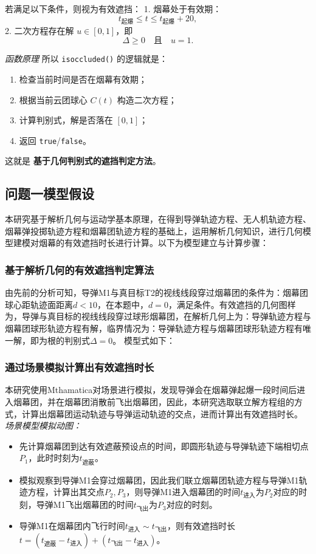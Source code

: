 \documentclass{article}
\begin{document}
若满足以下条件，则视为有效遮挡：
1. 烟幕处于有效期：
\[
t_{\text{起爆}} \leq t \leq t_{\text{起爆}} + 20,
\]
2. 二次方程存在解 $u \in [0,1]$，即
\[
\Delta \geq 0 \quad \text{且} \quad u = 1.
\]

\textit{函数原理}
所以 \texttt{isoccluded()} 的逻辑就是：

\begin{enumerate}[leftmargin=*,label=\arabic*.]
  \item 检查当前时间是否在烟幕有效期；
  \item 根据当前云团球心 \(C(t)\) 构造二次方程；
  \item 计算判别式，解是否落在 \([0,1]\)；
  \item 返回 \texttt{true}/\texttt{false}。
\end{enumerate}

这就是 \textbf{基于几何判别式的遮挡判定方法}。

\subsection{问题一模型假设}

本研究基于解析几何与运动学基本原理，在得到导弹轨迹方程、无人机轨迹方程、烟幕弹投掷轨迹方程和烟幕团轨迹方程的基础上，运用解析几何知识，进行几何模型建模对烟幕的有效遮挡时长进行计算。以下为模型建立与计算步骤：

\subsubsection{基于解析几何的有效遮挡判定算法}

由先前的分析可知，导弹M1与真目标T2的视线线段穿过烟幕团的条件为：烟幕团球心距轨迹面距离$d<10$，在本题中，$d = 0$，满足条件。有效遮挡的几何图样为，导弹与真目标的视线线段穿过球形烟幕团，在解析几何上为：导弹轨迹方程与烟幕团球形轨迹方程有解，临界情况为：导弹轨迹方程与烟幕团球形轨迹方程有唯一解，即为根的判别式$\Delta  = 0$。
模型式如下：
\subsubsection{通过场景模拟计算出有效遮挡时长}
本研究使用Mthamatica对场景进行模拟，发现导弹会在烟幕弹起爆一段时间后进入烟幕团，并在烟幕团消散前飞出烟幕团，因此，本研究选取联立解方程组的方式，计算出烟幕团运动轨迹与导弹运动轨迹的交点，进而计算出有效遮挡时长。
\textit{场景模型模拟动图：}

\begin{itemize}
    \item 先计算烟幕团到达有效遮蔽预设点的时间，即圆形轨迹与导弹轨迹下端相切点$P_1$，此时时刻为$t_\text{遮蔽}$。
    \item 模拟观察到导弹M1会穿过烟幕团，因此我们联立烟幕团轨迹方程与导弹M1轨迹方程，计算出其交点$P_2,P_3$，则导弹M1进入烟幕团的时间$t_{\text{进入}}$为$P_2$对应的时刻，导弹M1飞出烟幕团的时间$t_{\text{飞出}}$为$P_3$对应的时刻。
    \item 导弹M1在烟幕团内飞行时间$t_{\text{进入}} \sim t_{\text{飞出}}$，则有效遮挡时长$t =(t_\text{遮蔽}- t_\text{进入}) + (t_{\text{飞出}} - t_{\text{进入}})$。
\end{itemize}
\end{document}
